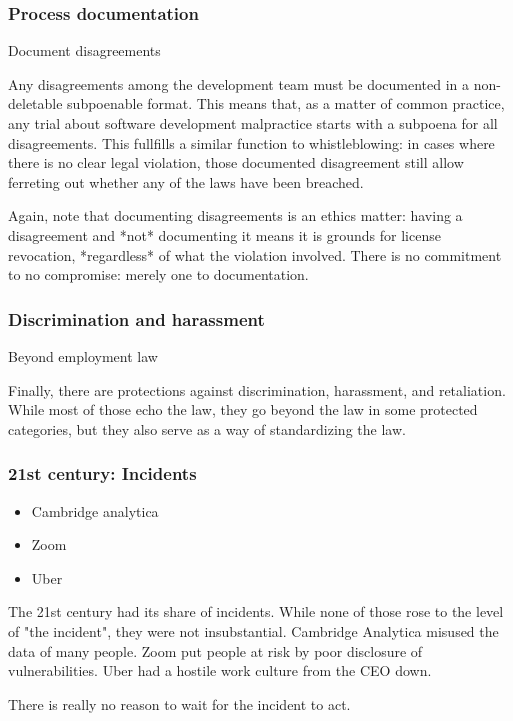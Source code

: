 \begin{frame}[fragile]
\frametitle{Process documentation}

Document disagreements

\end{frame}

Any disagreements among the development team must be documented
in a non-deletable subpoenable format.
This means that,
as a matter of common practice,
any trial about software development malpractice starts with
a subpoena for all disagreements.
This fullfills a similar function to whistleblowing:
in cases where there is no clear legal violation,
those documented disagreement still allow ferreting out whether
any of the laws have been breached.

Again,
note that documenting disagreements is an ethics matter:
having a disagreement and
*not*
documenting it means it is grounds for license revocation,
*regardless*
of what the violation involved.
There is no commitment to no compromise:
merely one to documentation.

\begin{frame}[fragile]
\frametitle{Discrimination and harassment}

Beyond employment law

\end{frame}

Finally,
there are protections against discrimination,
harassment,
and retaliation.
While most of those echo the law,
they go beyond the law in some protected categories,
but they also serve as a way of standardizing the law.

\begin{frame}[fragile]
\frametitle{21st century: Incidents}

\begin{itemize}
\item Cambridge analytica
\item Zoom
\item Uber
\end{itemize}

\end{frame}

The 21st century had its share of incidents.
While none of those rose to the level of
"the incident",
they were not insubstantial.
Cambridge Analytica misused the data of many people.
Zoom put people at risk by poor disclosure of vulnerabilities.
Uber had a hostile work culture from the CEO down.

There is really no reason to wait for the incident to act.


